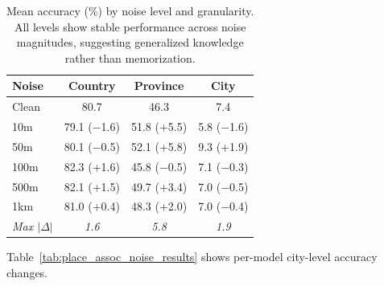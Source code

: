 \begin{table}[htbp]
\centering
\caption{Mean accuracy (\%) by noise level and granularity. All levels show stable performance across noise magnitudes, suggesting generalized knowledge rather than memorization.}
\label{tab:noise_by_granularity}
\small
\begin{tabular}{lccc}
\toprule
\textbf{Noise} & \textbf{Country} & \textbf{Province} & \textbf{City} \\
\midrule
Clean & 80.7 & 46.3 & 7.4 \\
10m & 79.1 ($-$1.6) & 51.8 (+5.5) & 5.8 ($-$1.6) \\
50m & 80.1 ($-$0.5) & 52.1 (+5.8) & 9.3 (+1.9) \\
100m & 82.3 (+1.6) & 45.8 ($-$0.5) & 7.1 ($-$0.3) \\
500m & 82.1 (+1.5) & 49.7 (+3.4) & 7.0 ($-$0.5) \\
1km & 81.0 (+0.4) & 48.3 (+2.0) & 7.0 ($-$0.4) \\
\midrule
\textit{Max $|\Delta|$} & \textit{1.6} & \textit{5.8} & \textit{1.9} \\
\bottomrule
\end{tabular}
\end{table}

Table~\ref{tab:place_assoc_noise_results} shows per-model city-level accuracy changes.


